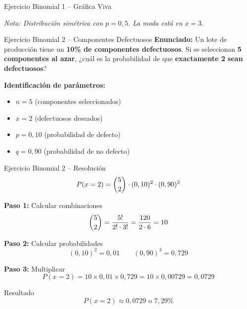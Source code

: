 \documentclass[10pt]{beamer}
\begin{document}
\begin{frame}{Ejercicio Binomial 1 -- Gráfica Viva}
\begin{center}
\end{center}
\footnotesize
\textit{Nota: Distribución simétrica con $p=0,5$. La moda está en $x=3$.}
\end{frame}

\begin{frame}{Ejercicio Binomial 2 -- Componentes Defectuosos}
\textbf{Enunciado:}
\justifying
Un lote de producción tiene un \textbf{10\% de componentes defectuosos}. Si se seleccionan \textbf{5 componentes al azar}, ¿cuál es la probabilidad de que \textbf{exactamente 2 sean defectuosos}?

\vspace{0.2cm}
\textbf{Identificación de parámetros:}
\begin{itemize}
    \item $n = 5$ (componentes seleccionados)
    \item $x = 2$ (defectuosos deseados)
    \item $p = 0,10$ (probabilidad de defecto)
    \item $q = 0,90$ (probabilidad de no defecto)
\end{itemize}
\end{frame}

\begin{frame}{Ejercicio Binomial 2 -- Resolución}
\[
P(x=2) = \dbinom{5}{2} \cdot (0,10)^{2} \cdot (0,90)^{3}
\]

\textbf{Paso 1:} Calcular combinaciones
\[
\dbinom{5}{2} = \frac{5!}{2! \cdot 3!} = \frac{120}{2 \cdot 6} = 10
\]

\textbf{Paso 2:} Calcular probabilidades
\[
(0,10)^{2} = 0,01 \qquad (0,90)^{3} = 0,729
\]

\textbf{Paso 3:} Multiplicar
\[
P(x=2) = 10 \times 0,01 \times 0,729 = 10 \times 0,00729 = 0,0729
\]

\begin{block}{Resultado}
\[
\boxed{P(x=2) \approx 0,0729 \text{ o } 7,29\%}
\]
\end{block}
\end{frame}
\end{document}
